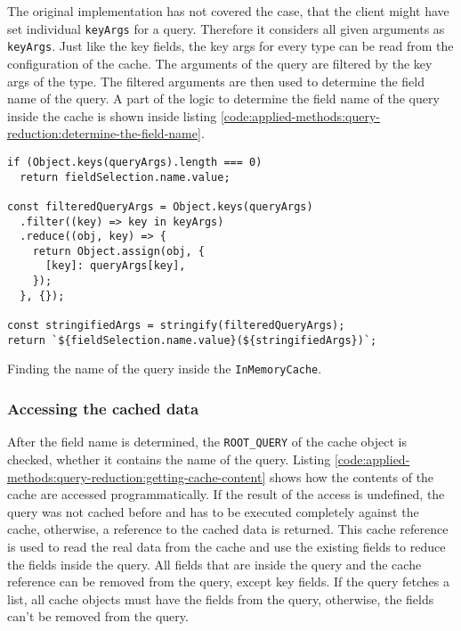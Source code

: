 \bigskip

\noindent The original implementation has not covered the case, that the client might have set individual \texttt{keyArgs} for a query. Therefore it considers all given arguments as \texttt{keyArgs}. Just like the key fields, the key args for every type can be read from the configuration of the cache. The arguments of the query are filtered by the key args of the type. The filtered arguments are then used to determine the field name of the query. A part of the logic to determine the field name of the query inside the cache is shown inside listing \ref{code:applied-methods:query-reduction:determine-the-field-name}.

\ifshowListings
\begin{listing}[H]
\begin{verbatim}
if (Object.keys(queryArgs).length === 0)
  return fieldSelection.name.value;

const filteredQueryArgs = Object.keys(queryArgs)
  .filter((key) => key in keyArgs)
  .reduce((obj, key) => {
    return Object.assign(obj, {
      [key]: queryArgs[key],
    });
  }, {});

const stringifiedArgs = stringify(filteredQueryArgs);
return `${fieldSelection.name.value}(${stringifiedArgs})`;
\end{verbatim}
\caption{Finding the name of the query inside the \texttt{InMemoryCache}.}\label{code:applied-methods:query-reduction:determine-the-field-name}
\end{listing}
\fi

\subsubsection{Accessing the cached data}

\noindent After the field name is determined, the \texttt{ROOT\_QUERY} of the cache object is checked, whether it contains the name of the query. Listing \ref{code:applied-methods:query-reduction:getting-cache-content} shows how the contents of the cache are accessed programmatically. If the result of the access is undefined, the query was not cached before and has to be executed completely against the cache, otherwise, a reference to the cached data is returned. This cache reference is used to read the real data from the cache and use the existing fields to reduce the fields inside the query. All fields that are inside the query and the cache reference can be removed from the query, except key fields. If the query fetches a list, all cache objects must have the fields from the query, otherwise, the fields can't be removed from the query.

